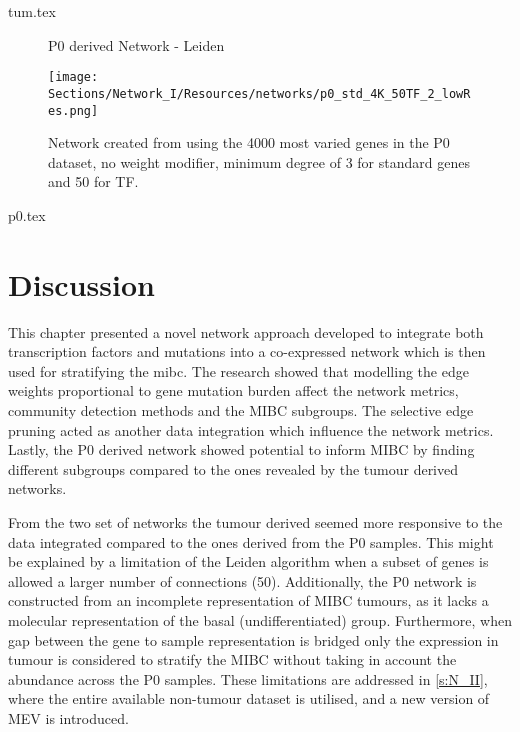 {tum.tex}

\newpage
{}
\begin{figure}[p]
  \thispagestyle{empty} %
  \centering
  \captionsetup{justification=centering, labelfont=bf}
    \parbox{\textwidth}{\centering \Huge P0 derived Network - Leiden} 
    \vspace{3cm} %
        \label{fig:N_I:tum_P0}
    \texttt{[image: Sections/Network\_I/Resources/networks/p0\_std\_4K\_50TF\_2\_lowRes.png]} %
    \parbox{0.8\textwidth}{\centering Network created from using the 4000 most varied genes in the P0 dataset, no weight modifier, minimum degree of 3 for standard genes and 50 for TF.}
\end{figure}
\restoregeometry
\newpage


{p0.tex}


\section{Discussion}


This chapter presented a novel network approach developed to integrate both transcription factors and mutations into a co-expressed network which is then used for stratifying the \acrlong{mibc}. The research showed that modelling the edge weights proportional to gene mutation burden affect the network metrics, community detection methods and the MIBC subgroups. The selective edge pruning  acted as another data integration which influence the network metrics. Lastly, the P0 derived network showed potential to inform MIBC by finding different subgroups compared to the ones revealed by the tumour derived networks.

From the two set of networks the tumour derived seemed more responsive to the data integrated compared to the ones derived from the P0 samples. This might be explained by a limitation of the Leiden algorithm when a subset of genes is allowed a larger number of connections (50). Additionally, the P0 network is constructed from an incomplete representation of MIBC tumours, as it lacks a molecular representation of the basal (undifferentiated) group. Furthermore, when gap between the gene to sample representation is bridged only the expression in tumour is considered to stratify the MIBC without taking in account the abundance across the P0 samples. These limitations are addressed in \cref{s:N_II}, where the entire available non-tumour dataset is utilised, and a new version of MEV is introduced.


